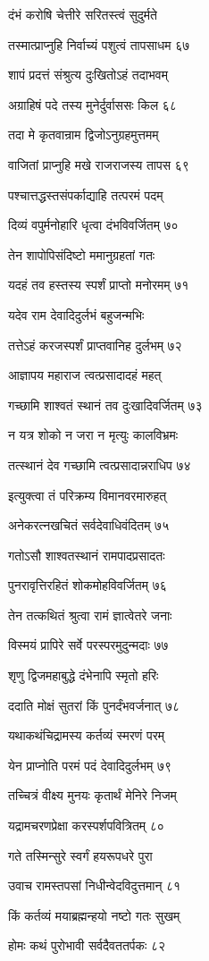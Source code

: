 दंभं करोषि चेत्तीरे सरितस्त्वं सुदुर्मते

तस्मात्प्राप्नुहि निर्वाच्यं पशुत्वं तापसाधम ६७

शापं प्रदत्तं संश्रुत्य दुःखितोऽहं तदाभवम्

अग्राहिषं पदे तस्य मुनेर्दुर्वाससः किल ६८

तदा मे कृतवान्राम द्विजोऽनुग्रहमुत्तमम्

वाजितां प्राप्नुहि मखे राजराजस्य तापस ६९

पश्चात्तद्धस्तसंपर्काद्याहि तत्परमं पदम्

दिव्यं वपुर्मनोहारि धृत्वा दंभविवर्जितम् ७०

तेन शापोपिसंदिष्टो ममानुग्रहतां गतः

यदहं तव हस्तस्य स्पर्शं प्राप्तो मनोरमम् ७१

यदेव राम देवादिदुर्लभं बहुजन्मभिः

तत्तेऽहं करजस्पर्शं प्राप्तवानिह दुर्लभम् ७२

आज्ञापय महाराज त्वत्प्रसादादहं महत्

गच्छामि शाश्वतं स्थानं तव दुःखादिवर्जितम् ७३

न यत्र शोको न जरा न मृत्युः कालविभ्रमः

तत्स्थानं देव गच्छामि त्वत्प्रसादान्नराधिप ७४

इत्युक्त्वा तं परिक्रम्य विमानवरमारुहत्

अनेकरत्नखचितं सर्वदेवाधिवंदितम् ७५

गतोऽसौ शाश्वतस्थानं रामपादप्रसादतः

पुनरावृत्तिरहितं शोकमोहविवर्जितम् ७६

तेन तत्कथितं श्रुत्वा रामं ज्ञात्वेतरे जनाः

विस्मयं प्रापिरे सर्वे परस्परमुदुन्मदाः ७७

शृणु द्विजमहाबुद्धे दंभेनापि स्मृतो हरिः

ददाति मोक्षं सुतरां किं पुनर्दंभवर्जनात् ७८

यथाकथंचिद्रामस्य कर्तव्यं स्मरणं परम्

येन प्राप्नोति परमं पदं देवादिदुर्लभम् ७९

तच्चित्रं वीक्ष्य मुनयः कृतार्थं मेनिरे निजम्

यद्रामचरणप्रेक्षा करस्पर्शपवित्रितम् ८०

गते तस्मिन्सुरे स्वर्गं हयरूपधरे पुरा

उवाच रामस्तपसां निधीन्वेदविदुत्तमान् ८१

किं कर्तव्यं मयाब्रह्मन्हयो नष्टो गतः सुखम्

होमः कथं पुरोभावी सर्वदैवततर्पकः ८२


